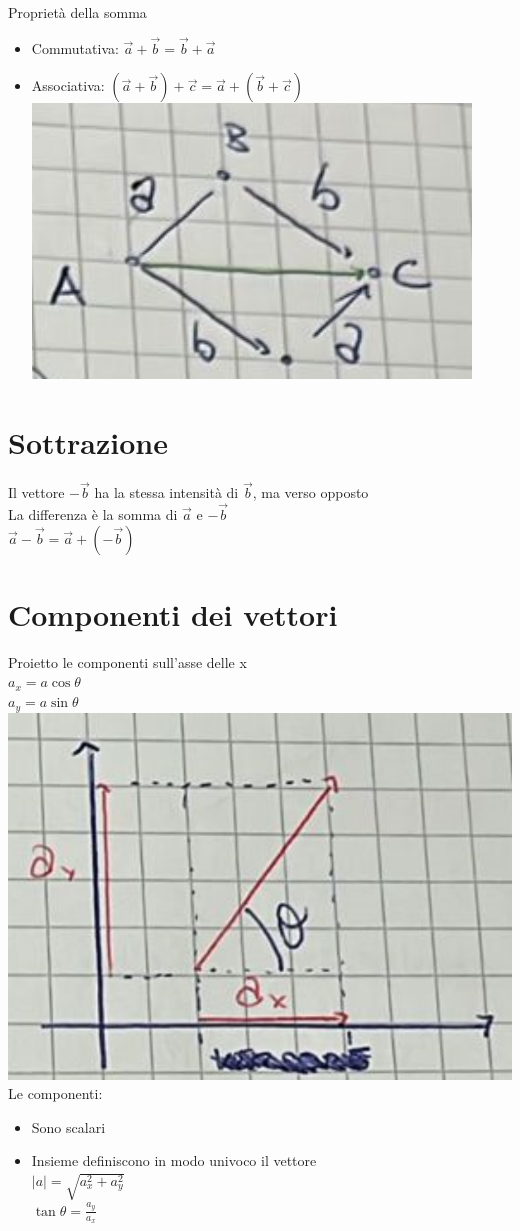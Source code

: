 \documentclass{report}
\begin{document}
Proprietà della somma
\begin{itemize}
  \item Commutativa: $\vec{a}+\vec{b}=\vec{b}+\vec{a}$
  \item Associativa: $(\vec{a}+\vec{b})+\vec{c}=\vec{a}+(\vec{b}+\vec{c})$\\\includegraphics[scale=0.3]{img3.png}
\end{itemize}
\section{Sottrazione}
Il vettore $-\vec{b}$ ha la stessa intensità di $\vec{b}$, ma verso opposto\\
La differenza è la somma di $\vec{a}$ e $-\vec{b}$\\
$\vec{a}-\vec{b}=\vec{a}+(-\vec{b})$\\
\section{Componenti dei vettori}
Proietto le componenti sull'asse delle x\\
$a_x=a\cos\theta$\\
$a_y=a\sin\theta$\\
\includegraphics[scale=0.3]{img4.png}
Le componenti:
\begin{itemize}
  \item Sono scalari
  \item Insieme definiscono in modo univoco il vettore\\$|a|=\sqrt{a_x^2+a_y^2}$\\$\tan\theta=\frac{a_y}{a_x}$
\end{itemize}
\end{document}
